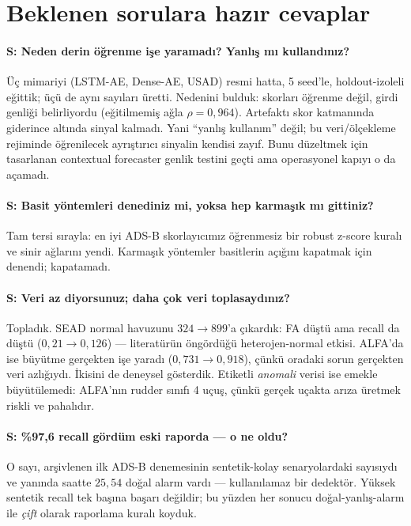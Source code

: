 \documentclass[11pt,a4paper]{article}
\begin{document}
\section{Beklenen sorulara hazır cevaplar}

\paragraph{S: Neden derin öğrenme işe yaramadı? Yanlış mı kullandınız?}
Üç mimariyi (LSTM-AE, Dense-AE, USAD) resmi hatta, 5 seed'le, holdout-izoleli
eğittik; üçü de aynı sayıları üretti. Nedenini bulduk: skorları öğrenme değil,
girdi genliği belirliyordu (eğitilmemiş ağla $\rho = 0{,}964$). Artefaktı skor
katmanında giderince altında sinyal kalmadı. Yani ``yanlış kullanım'' değil; bu
veri/ölçekleme rejiminde öğrenilecek ayrıştırıcı sinyalin kendisi zayıf. Bunu
düzeltmek için tasarlanan contextual forecaster genlik testini geçti ama
operasyonel kapıyı o da açamadı.

\paragraph{S: Basit yöntemleri denediniz mi, yoksa hep karmaşık mı gittiniz?}
Tam tersi sırayla: en iyi ADS-B skorlayıcımız öğrenmesiz bir robust z-score kuralı
ve sinir ağlarını yendi. Karmaşık yöntemler basitlerin açığını kapatmak için
denendi; kapatamadı.

\paragraph{S: Veri az diyorsunuz; daha çok veri toplasaydınız?}
Topladık. SEAD normal havuzunu $324 \to 899$'a çıkardık: FA düştü ama recall da
düştü ($0{,}21 \to 0{,}126$) --- literatürün öngördüğü heterojen-normal etkisi.
ALFA'da ise büyütme gerçekten işe yaradı ($0{,}731 \to 0{,}918$), çünkü oradaki
sorun gerçekten veri azlığıydı. İkisini de deneysel gösterdik. Etiketli
\emph{anomali} verisi ise emekle büyütülemedi: ALFA'nın rudder sınıfı 4 uçuş,
çünkü gerçek uçakta arıza üretmek riskli ve pahalıdır.

\paragraph{S: \%97{,}6 recall gördüm eski raporda --- o ne oldu?}
O sayı, arşivlenen ilk ADS-B denemesinin sentetik-kolay senaryolardaki sayısıydı
ve yanında saatte $25{,}54$ doğal alarm vardı --- kullanılamaz bir dedektör.
Yüksek sentetik recall tek başına başarı değildir; bu yüzden her sonucu
doğal-yanlış-alarm ile \emph{çift} olarak raporlama kuralı koyduk.
\end{document}
